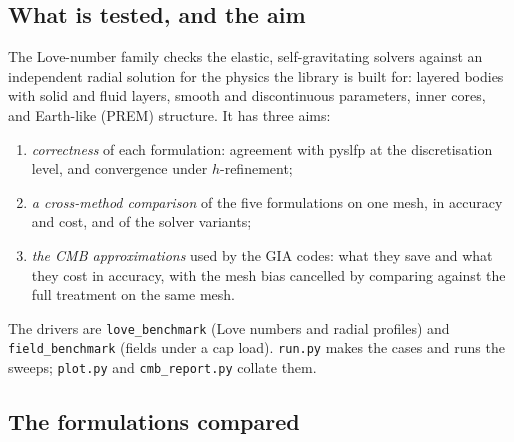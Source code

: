 \documentclass[11pt]{article}
\numberwithin{equation}{section}
\newcommand{\code}[1]{\texttt{#1}}
\begin{document}
\subsection{What is tested, and the aim}

The Love-number family checks the elastic, self-gravitating solvers
against an independent radial solution for the physics the library is
built for: layered bodies with solid and fluid layers, smooth and
discontinuous parameters, inner cores, and Earth-like (PREM) structure.
It has three aims:
\begin{enumerate}[leftmargin=*]
\item \emph{correctness} of each formulation: agreement with pyslfp at the
  discretisation level, and convergence under $h$-refinement;
\item \emph{a cross-method comparison} of the five formulations on one
  mesh, in accuracy and cost, and of the solver variants;
\item \emph{the CMB approximations} used by the GIA codes: what they
  save and what they cost in accuracy, with the mesh bias cancelled by
  comparing against the full treatment on the same mesh.
\end{enumerate}
The drivers are \code{love\_benchmark} (Love numbers and radial profiles)
and \code{field\_benchmark} (fields under a cap load). \code{run.py}
makes the cases and runs the sweeps; \code{plot.py} and
\code{cmb\_report.py} collate them.

\subsection{The formulations compared}
\label{sec:formulations}
\end{document}
